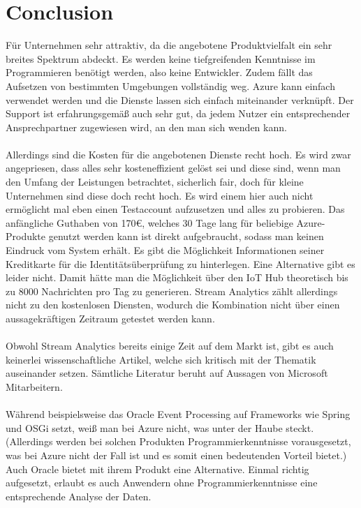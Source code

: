 \section{Conclusion}
Für Unternehmen sehr attraktiv, da die angebotene Produktvielfalt ein sehr breites Spektrum abdeckt. Es werden keine tiefgreifenden Kenntnisse im Programmieren benötigt werden, also keine Entwickler. Zudem fällt das Aufsetzen von bestimmten Umgebungen vollständig weg. Azure kann einfach verwendet werden und die Dienste lassen sich einfach miteinander verknüpft. Der Support ist erfahrungsgemäß auch sehr gut, da jedem Nutzer ein entsprechender Ansprechpartner zugewiesen wird, an den man sich wenden kann. \\ \\
Allerdings sind die Kosten für die angebotenen Dienste recht hoch. Es wird zwar angepriesen, dass alles sehr kosteneffizient gelöst sei und diese sind, wenn man den Umfang der Leistungen betrachtet, sicherlich fair, doch für kleine Unternehmen sind diese doch recht hoch. Es wird einem hier auch nicht ermöglicht mal eben einen Testaccount aufzusetzen und alles zu probieren. Das anfängliche Guthaben von 170€, welches 30 Tage lang für beliebige Azure-Produkte genutzt werden kann ist direkt aufgebraucht, sodass man keinen Eindruck vom System erhält. Es gibt die Möglichkeit Informationen seiner Kreditkarte für die Identitätsüberprüfung zu hinterlegen. Eine Alternative gibt es leider nicht. Damit hätte man die Möglichkeit über den IoT Hub theoretisch bis zu 8000 Nachrichten pro Tag zu generieren. Stream Analytics zählt allerdings nicht zu den kostenlosen Diensten, wodurch die Kombination nicht über einen aussagekräftigen Zeitraum getestet werden kann.\\ \\ 
Obwohl Stream Analytics bereits einige Zeit auf dem Markt ist, gibt es auch keinerlei wissenschaftliche Artikel, welche sich kritisch mit der Thematik auseinander setzen. Sämtliche Literatur beruht auf Aussagen von Microsoft Mitarbeitern.\\ \\
Während beispielsweise das Oracle Event Processing auf Frameworks wie Spring und OSGi setzt, weiß man bei Azure nicht, was unter der Haube steckt. (Allerdings werden bei solchen Produkten Programmierkenntnisse vorausgesetzt, was bei Azure nicht der Fall ist und es somit einen bedeutenden Vorteil bietet.) Auch Oracle bietet mit ihrem Produkt eine Alternative. Einmal richtig aufgesetzt, erlaubt es auch Anwendern ohne Programmierkenntnisse eine entsprechende Analyse der Daten.\\ \\

